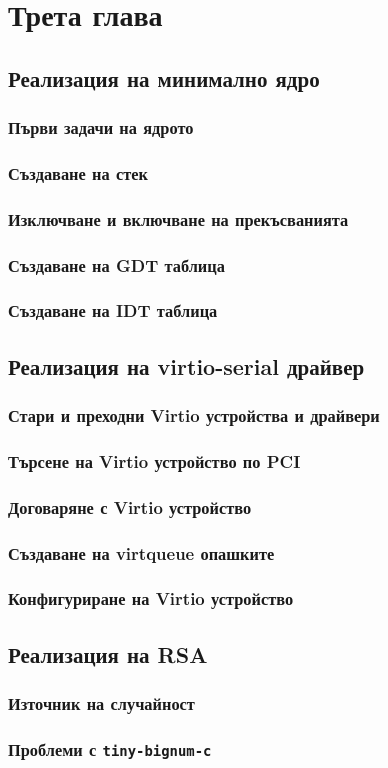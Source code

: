 \chapter{Трета глава} %
\section{Реализация на минимално ядро}
  \subsection{Първи задачи на ядрото}
  \subsection{Създаване на стек}
  \subsection{Изключване и включване на прекъсванията}
  \subsection{Създаване на GDT таблица}
  \subsection{Създаване на IDT таблица}
\section{Реализация на virtio-serial драйвер}
  \subsection{Стари и преходни Virtio устройства и драйвери}
  \subsection{Търсене на Virtio устройство по PCI}
  \subsection{Договаряне с Virtio устройство}
  \subsection{Създаване на virtqueue опашките}
  \subsection{Конфигуриране на Virtio устройство}
\section{Реализация на RSA}
  \subsection{Източник на случайност}
  \subsection{Проблеми с {\tt tiny-bignum-c}}
